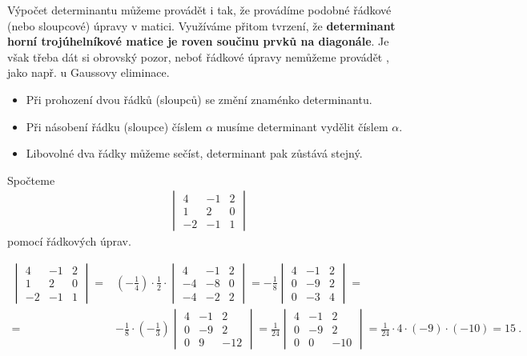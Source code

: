 Výpočet determinantu můžeme provádět i tak, že provádíme podobné řádkové (nebo sloupcové) úpravy v matici. Využíváme přitom tvrzení, že \textbf{determinant horní trojúhelníkové matice je roven součinu prvků na diagonále}. Je však třeba dát si obrovský pozor, neboť řádkové úpravy nemůžeme provádět , jako např. u Gaussovy eliminace.
\begin{itemize}
    \item Při prohození dvou řádků (sloupců) se změní znaménko determinantu.
    \item Při násobení řádku (sloupce) číslem $\alpha$ musíme determinant vydělit číslem $\alpha$.
    \item Libovolné dva řádky můžeme sečíst, determinant pak zůstává stejný.
\end{itemize}

\begin{example}
    Spočteme \begin{align}
        \begin{vmatrix}
            4 & -1 & 2 \\ 1 & 2 & 0 \\ -2 & -1 & 1
        \end{vmatrix}
    \end{align}
    pomocí řádkových úprav.

    \begin{align}
        \begin{vmatrix}
            4 & -1 & 2 \\ 1 & 2 & 0 \\ -2 & -1 & 1
        \end{vmatrix}
        =&
        \left( - \frac{1}{4} \right) \cdot \frac{1}{2} \cdot \begin{vmatrix}
            4 & -1 & 2 \\ -4 & -8 & 0 \\ -4 & -2 & 2
        \end{vmatrix}
        =
        - \frac{1}{8} \begin{vmatrix}
            4 & -1 & 2 \\ 0 & -9 & 2 \\ 0 & -3 & 4
        \end{vmatrix}
        = \\ =&
        - \frac{1}{8} \cdot \left( -\frac{1}{3}\right) \begin{vmatrix}
            4 & -1 & 2 \\ 0 & -9 & 2 \\ 0 & 9 & -12
        \end{vmatrix}
        =
        \frac{1}{24}
        \begin{vmatrix}
            4 & -1 & 2 \\ 0 & -9 & 2 \\ 0 & 0 & -10
        \end{vmatrix}
        = \frac{1}{24} \cdot 4 \cdot (-9) \cdot (-10) = 15 \:.
    \end{align}
\end{example}

